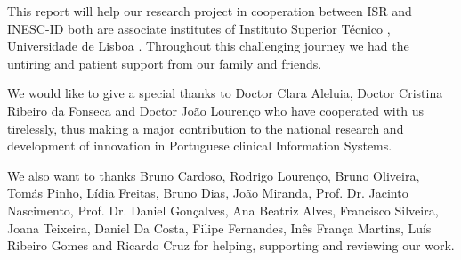 This report will help our research project in cooperation between ISR \cite{isr} and INESC-ID \cite{inescid} both are associate institutes of Instituto Superior T\'{e}cnico \cite{ist}, Universidade de Lisboa \cite{ul}. Throughout this challenging journey we had the untiring and patient support from our family and friends.

We would like to give a special thanks to Doctor Clara Aleluia, Doctor Cristina Ribeiro da Fonseca and Doctor Jo\~{a}o Louren\c{c}o who have cooperated with us tirelessly, thus making a major contribution to the national research and development of innovation in Portuguese clinical Information Systems.

We also want to thanks Bruno Cardoso, Rodrigo Louren\c{c}o, Bruno Oliveira, Tom\'{a}s Pinho, L\'{i}dia Freitas, Bruno Dias, Jo\~{a}o Miranda, Prof. Dr. Jacinto Nascimento, Prof. Dr. Daniel Gon\c{c}alves, Ana Beatriz Alves, Francisco Silveira, Joana Teixeira, Daniel Da Costa, Filipe Fernandes, In\^{e}s Fran\c{c}a Martins, Lu\'{i}s Ribeiro Gomes and Ricardo Cruz for helping, supporting and reviewing our work.

\clearpage

\printbibliography


